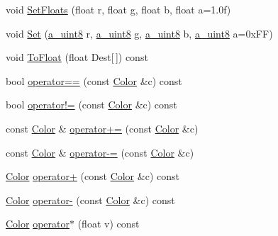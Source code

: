 \begin{DoxyCompactItemize}
\item 
void \hyperlink{class_agmd_utilities_1_1_color_a0d6555b4d2cb1430d220c5d71e26ef5b}{Set\+Floats} (float r, float \hyperlink{_examples_2_planet_2_app_8cpp_a8cf17d727651616de6f2b79ef32170cd}{g}, float b, float a=1.\+0f)
\item 
void \hyperlink{class_agmd_utilities_1_1_color_ac83264d4c8e976d243366041dc930873}{Set} (\hyperlink{_common_defines_8h_afbe6c09973474a1f78f870f39073398f}{a\+\_\+uint8} r, \hyperlink{_common_defines_8h_afbe6c09973474a1f78f870f39073398f}{a\+\_\+uint8} \hyperlink{_examples_2_planet_2_app_8cpp_a8cf17d727651616de6f2b79ef32170cd}{g}, \hyperlink{_common_defines_8h_afbe6c09973474a1f78f870f39073398f}{a\+\_\+uint8} b, \hyperlink{_common_defines_8h_afbe6c09973474a1f78f870f39073398f}{a\+\_\+uint8} a=0x\+F\+F)
\item 
void \hyperlink{class_agmd_utilities_1_1_color_a1883c09568d27ee49a120c4e0dd44666}{To\+Float} (float Dest\mbox{[}$\,$\mbox{]}) const 
\item 
bool \hyperlink{class_agmd_utilities_1_1_color_ac771841573965550c3cc72fa2b40888f}{operator==} (const \hyperlink{class_agmd_utilities_1_1_color}{Color} \&c) const 
\item 
bool \hyperlink{class_agmd_utilities_1_1_color_aa1fc6ba781b261093a811dcb5c854774}{operator!=} (const \hyperlink{class_agmd_utilities_1_1_color}{Color} \&c) const 
\item 
const \hyperlink{class_agmd_utilities_1_1_color}{Color} \& \hyperlink{class_agmd_utilities_1_1_color_a4b59dcc4c0063f43162564351fb10e41}{operator+=} (const \hyperlink{class_agmd_utilities_1_1_color}{Color} \&c)
\item 
const \hyperlink{class_agmd_utilities_1_1_color}{Color} \& \hyperlink{class_agmd_utilities_1_1_color_a4425e3bc6526d30a56edfcb3d3f679cf}{operator-\/=} (const \hyperlink{class_agmd_utilities_1_1_color}{Color} \&c)
\item 
\hyperlink{class_agmd_utilities_1_1_color}{Color} \hyperlink{class_agmd_utilities_1_1_color_a821125e127371847e9c490d31fa1426a}{operator+} (const \hyperlink{class_agmd_utilities_1_1_color}{Color} \&c) const 
\item 
\hyperlink{class_agmd_utilities_1_1_color}{Color} \hyperlink{class_agmd_utilities_1_1_color_a62621e41929e429a5309a0949813114b}{operator-\/} (const \hyperlink{class_agmd_utilities_1_1_color}{Color} \&c) const 
\item 
\hyperlink{class_agmd_utilities_1_1_color}{Color} \hyperlink{class_agmd_utilities_1_1_color_a757119695bc8701cac95d35cb41bd9cb}{operator$\ast$} (float v) const 

\end{DoxyCompactItemize}

